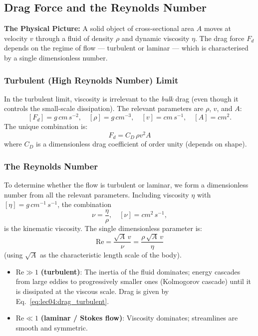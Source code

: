\subsection{Drag Force and the Reynolds Number}

\textbf{The Physical Picture:}
A solid object of cross-sectional area $A$ moves at velocity $v$ through a
fluid of density $\rho$ and dynamic viscosity $\eta$.  The drag force $F_d$
depends on the regime of flow — turbulent or laminar — which is characterised
by a single dimensionless number.

\subsubsection*{Turbulent (High Reynolds Number) Limit}

In the turbulent limit, viscosity is irrelevant to the \emph{bulk} drag (even
though it controls the small-scale dissipation).  The relevant parameters are
$\rho$, $v$, and $A$:
\[
    [F_d] = \si{g\,cm\,s^{-2}},\quad [\rho] = \si{g\,cm^{-3}},\quad
    [v] = \si{cm\,s^{-1}},\quad [A] = \si{cm^2}.
\]
The unique combination is:
\begin{equation}
    \boxed{F_d = C_D\,\rho v^2 A}
    \label{eq:lec04:drag_turbulent}
\end{equation}
where $C_D$ is a dimensionless drag coefficient of order unity (depends on
shape).

\subsubsection*{The Reynolds Number}

To determine whether the flow is turbulent or laminar, we form a dimensionless
number from all the relevant parameters.  Including viscosity $\eta$ with
$[\eta] = \si{g\,cm^{-1}\,s^{-1}}$, the combination
\[
    \nu = \frac{\eta}{\rho}, \quad [\nu] = \si{cm^2\,s^{-1}},
\]
is the kinematic viscosity.  The single dimensionless parameter is:
\begin{equation}
    \boxed{\text{Re} = \frac{\sqrt{A}\,v}{\nu} = \frac{\rho\,\sqrt{A}\,v}{\eta}}
    \label{eq:lec04:reynolds}
\end{equation}
(using $\sqrt{A}$ as the characteristic length scale of the body).

\begin{itemize}
    \item $\text{Re} \gg 1$ \textbf{(turbulent)}: The inertia of the fluid
    dominates; energy cascades from large eddies to progressively smaller ones
    (Kolmogorov cascade) until it is dissipated at the viscous scale.  Drag is
    given by Eq.~\eqref{eq:lec04:drag_turbulent}.
    \item $\text{Re} \ll 1$ \textbf{(laminar / Stokes flow)}: Viscosity
    dominates; streamlines are smooth and symmetric.
\end{itemize}

